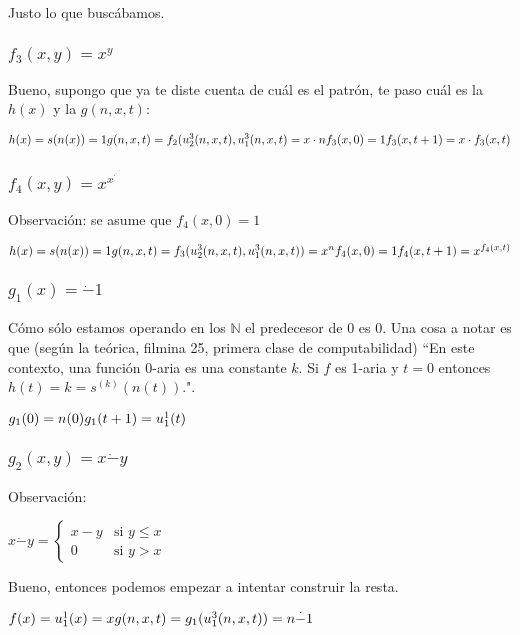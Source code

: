 \documentclass[11pt]{article} %
\newlength{\desarrollolen}
\newcommand{\desarrollo}[2][3em]{

    \hspace{2em}
    \addtolength{\desarrollolen}{-#1}
    \begin{minipage}{\desarrollolen}
        #2
    \end{minipage}
    \addtolength{\desarrollolen}{#1}

}
\newcommand{\nat}{\mathbb{N}}
\begin{document}
Justo lo que buscábamos.

\subsubsection{$f_3(x,y)=x^y$}

Bueno, supongo que ya te diste cuenta de cuál es el patrón, te paso cuál es la $h(x)$ y la $g(n,x,t)$:
\desarrollo{$
h(x)     = s(n(x)) = 1 \\
g(n,x,t) = f_2(u^3_2(n,x,t), u^3_1(n,x,t) = x \cdot n \\
\\
f_3(x,0)   = 1 \\
f_3(x,t+1) = x \cdot f_3(x,t)
$}

\subsubsection{$f_4(x,y)=x^{x^{\cdot^{\cdot^{\cdot^{^{x}}}}}}$}

Observación: se asume que $f_4(x,0)=1$
\desarrollo{$
h(x) = s(n(x)) = 1 \\
g(n,x,t) = f_3(u^3_2(n,x,t),u^3_1(n,x,t)) = x^n \\
\\
f_4(x,0) = 1 \\
f_4(x,t+1) = x^{f_4(x,t)}
$}

\subsubsection{$g_1(x)=\dot-1$}

Cómo sólo estamos operando en los $\nat$ el predecesor de 0 es 0. Una cosa a notar es que (según la teórica, filmina 25, primera clase de computabilidad) ``En este contexto, una función 0-aria es una constante $k$. Si $f$ es 1-aria y $t=0$ entonces $h(t)=k=s^{(k)}(n(t))$.".
\desarrollo{$
g_1(0) = n(0)\\
g_1(t+1) = u^1_1(t)
$}

\subsubsection{$g_2(x,y)=x\dot-y$}

Observación:
\desarrollo{$
x\dot-y =
\begin{cases}
  x - y & \text{si } y \le x \\
  0     & \text{si } y > x
\end{cases}
$}

Bueno, entonces podemos empezar a intentar construir la resta.
\desarrollo{$
f(x) = u^1_1(x) = x \\
g(n, x, t) = g_1(u^3_1(n,x,t)) = n \dot- 1
$}
\end{document}
